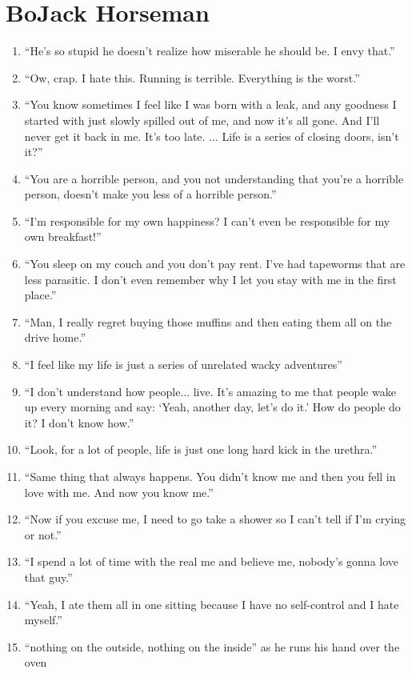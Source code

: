 \documentclass{book}
\numberwithin{equation}{section}
\begin{document}
\section{BoJack Horseman}
\begin{enumerate}
    \item ``He's so stupid he doesn't realize how miserable he should be. I envy that.''
    \item ``Ow, crap. I hate this. Running is terrible. Everything is the worst.''
    \item ``You know sometimes I feel like I was born with a leak, and any goodness I started with just slowly spilled out of me, and now it's all gone. And I'll never get it back in me. It's too late. ... Life is a series of closing doors, isn't it?''
    \item``You are a horrible person, and you not understanding that you're a horrible person, doesn't make you less of a horrible person.''
    \item ``I'm responsible for my own happiness? I can't even be responsible for my own breakfast!''
    \item ``You sleep on my couch and you don't pay rent. I've had tapeworms that are less parasitic. I don't even remember why I let you stay with me in the first place.''
    \item ``Man, I really regret buying those muffins and then eating them all on the drive home.''
    \item ``I feel like my life is just a series of unrelated wacky adventures''
    \item ``I don't understand how people... live. It's amazing to me that people wake up every morning and say: `Yeah, another day, let's do it.' How do people do it? I don't know how.''
    \item ``Look, for a lot of people, life is just one long hard kick in the urethra.''
    \item ``Same thing that always happens. You didn't know me and then you fell in love with me. And now you know me.''
    \item ``Now if you excuse me, I need to go take a shower so I can't tell if I'm crying or not.''
    \item ``I spend a lot of time with the real me and believe me, nobody's gonna love that guy.''
    \item ``Yeah, I ate them all in one sitting because I have no self-control and I hate myself.''
    \item ``nothing on the outside, nothing on the inside'' as he runs his hand over the oven

\end{enumerate}
\end{document}
